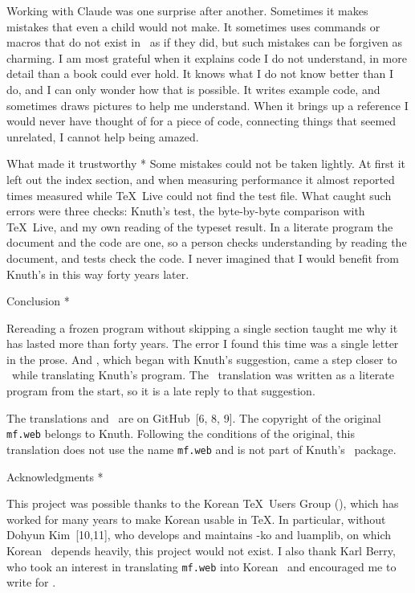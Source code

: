 {Working with Claude was one surprise after another. Sometimes it makes
mistakes that even a child would not make. It sometimes uses commands
or macros that do not exist in \GWEB\ as if they did, but such
mistakes can be forgiven as charming. I am most grateful when it
explains code I do not understand, in more detail than a book could
ever hold. It knows what I do not know better than I do, and I can only
wonder how that is possible. It writes example code, and sometimes
draws pictures to help me understand. When it brings up a reference I
would never have thought of for a piece of code, connecting things
that seemed unrelated, I cannot help being amazed.

\subhead * What made it trustworthy *
Some mistakes could not be taken lightly. At first it left out the
index section, and when measuring performance it almost reported times
measured while \TeX\ Live could not find the test file. What caught
such errors were three checks: Knuth's  test, the
byte-by-byte comparison with \TeX\ Live, and my own reading of the
typeset result. In a literate program the document and the code are
one, so a person checks understanding by reading the document, and
tests check the code. I never imagined that I would benefit from
Knuth's  in this way forty years later.

\quad Conclusion *

Rereading a frozen program without skipping a single section taught me
why it has lasted more than forty years. The error I found this time
was a single letter in the prose. And \GWEB, which began with Knuth's
suggestion, came a step closer to \CWEB\ while translating Knuth's
program. The \MF\ translation was written as a literate program from
the start, so it is a late reply to that suggestion.

The translations and \GWEB\ are on GitHub~[6, 8, 9]. The copyright of
the original {\tt mf.web} belongs to Knuth. Following the conditions of
the original, this translation does not use the name {\tt mf.web} and
is not part of Knuth's \MF\ package.

\head * Acknowledgments *

This project was possible thanks to the Korean \TeX\ Users Group
(), which has worked for many years to make Korean usable in
\TeX. In particular, without Dohyun Kim~[10,11], who develops and
maintains \LuaTeX-ko and luamplib, on which Korean \GWEB\ depends
heavily, this project would not exist. I also thank Karl Berry, who
took an interest in translating {\tt mf.web} into Korean \GWEB\ and
encouraged me to write for \TUB.

}
